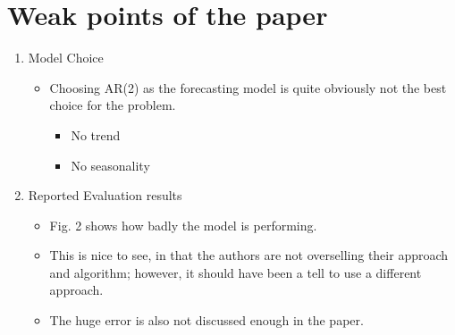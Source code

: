 \documentclass[peerreview]{IEEEtran}
\begin{document}
\section{Weak points of the paper}
\begin{enumerate}
    \item Model Choice
    \begin{itemize}
        \item Choosing AR(2) as the forecasting model is quite obviously not the best choice for the problem.
        \begin{itemize}
            \item No trend
            \item No seasonality
        \end{itemize}
    \end{itemize}
    \item Reported Evaluation results
    \begin{itemize}
        \item Fig. 2 shows how badly the model is performing.
        \item This is nice to see, in that the authors are not overselling their approach and algorithm; however, it should have been a tell to use a different approach.
        \item The huge error is also not discussed enough in the paper.
    \end{itemize}
\end{enumerate}
\end{document}

